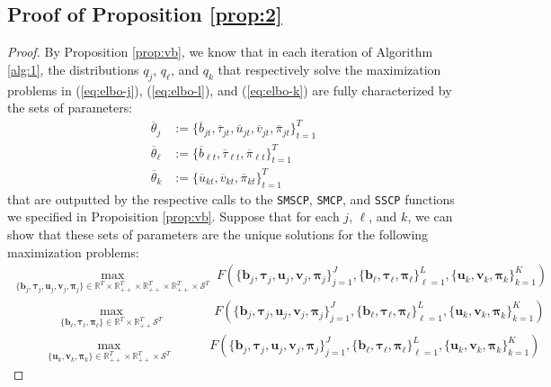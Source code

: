 \subsection{Proof of Proposition \ref{prop:2}}
\label{app:prop2-proof}

\begin{proof}
By Proposition \ref{prop:vb}, we know that in each iteration of Algorithm \ref{alg:1}, the distributions $q_j$, $q_\ell$, and $q_k$ that respectively solve the maximization problems in (\ref{eq:elbo-j}), (\ref{eq:elbo-l}), and (\ref{eq:elbo-k}) are fully characterized by the sets of parameters:
\begin{align*}
    \overline{\theta}_j &:= \{\overline{b}_{jt}, \overline{\tau}_{jt}, \overline{u}_{jt}, \overline{v}_{jt}, \overline{\pi}_{jt}\}_{t=1}^T \\
    \overline{\theta}_\ell &:= \{\overline{b}_{\ell t}, \overline{\tau}_{\ell t}, \overline{\pi}_{\ell t}\}_{t=1}^T\\
    \overline{\theta}_k &:= \{\overline{u}_{kt}, \overline{v}_{kt}, \overline{\pi}_{kt}\}_{t=1}^T
\end{align*} 
that are outputted by the respective calls to the \texttt{SMSCP}, \texttt{SMCP}, and \texttt{SSCP} functions we specified in Propoisition \ref{prop:vb}. Suppose that for each $j$, $\ell$, and $k$, we can show that these sets of parameters are the unique solutions for the following maximization problems: 
\begin{gather*}
    \max_{\{\mathbf{b}_j, \boldsymbol{\tau}_j, \mathbf{u}_j, \mathbf{v}_j, \boldsymbol{\pi}_j\} \in \mathbb{R}^T\times\mathbb{R}_{++}^T\times\mathbb{R}_{++}^T\times\mathbb{R}_{++}^T \times\mathcal{S}^T} \; F(\{\mathbf{b}_j, \boldsymbol{\tau}_j, \mathbf{u}_j, \mathbf{v}_j, \boldsymbol{\pi}_j\}_{j=1}^J, \{\mathbf{b}_\ell, \boldsymbol{\tau}_\ell, \boldsymbol{\pi}_\ell\}_{\ell=1}^L, \{\mathbf{u}_k, \mathbf{v}_k, \boldsymbol{\pi}_k\}_{k=1}^K) \\
    \;\;\quad\quad\quad\max_{\{\mathbf{b}_\ell, \boldsymbol{\tau}_\ell, \boldsymbol{\pi}_\ell\} \in \mathbb{R}^T\times\mathbb{R}_{++}^T\mathcal{S}^T} \;\quad\quad\quad\;\; F(\{\mathbf{b}_j, \boldsymbol{\tau}_j, \mathbf{u}_j, \mathbf{v}_j, \boldsymbol{\pi}_j\}_{j=1}^J, \{\mathbf{b}_\ell, \boldsymbol{\tau}_\ell, \boldsymbol{\pi}_\ell\}_{\ell=1}^L, \{\mathbf{u}_k, \mathbf{v}_k, \boldsymbol{\pi}_k\}_{k=1}^K) \\
    \;\;\quad\quad\max_{\{\mathbf{u}_k, \mathbf{v}_k, \boldsymbol{\pi}_k\} \in \mathbb{R}_{++}^T\times\mathbb{R}_{++}^T \times\mathcal{S}^T} \;\quad\quad\;\; F(\{\mathbf{b}_j, \boldsymbol{\tau}_j, \mathbf{u}_j, \mathbf{v}_j, \boldsymbol{\pi}_j\}_{j=1}^J, \{\mathbf{b}_\ell, \boldsymbol{\tau}_\ell, \boldsymbol{\pi}_\ell\}_{\ell=1}^L, \{\mathbf{u}_k, \mathbf{v}_k, \boldsymbol{\pi}_k\}_{k=1}^K) 

\end{gather*}
\end{proof}
